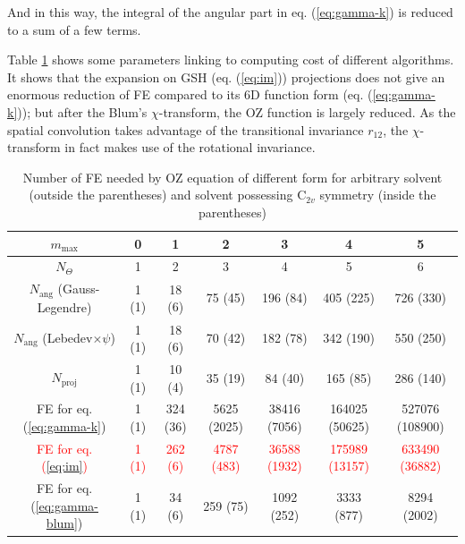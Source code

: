 And in this way, the integral of the angular part in eq. (\ref{eq:gamma-k})
is reduced to a sum of a few terms.

Table \ref{tab:FE-of-OZ} shows some parameters linking to computing
cost of different algorithms. It shows that the expansion on GSH (eq.
(\ref{eq:im})) projections does not give an enormous reduction of
FE compared to its 6D function form (eq. (\ref{eq:gamma-k})); but
after the Blum's $\chi$-transform, the OZ function is largely reduced.
As the spatial convolution takes advantage of the transitional invariance
$r_{12}$, the $\chi$-transform in fact makes use of the rotational
invariance.

\begin{table}[h]
\begin{centering}
\begin{tabular*}{1\textwidth}{@{\extracolsep{\fill}}ccccccc}
\toprule 
{\footnotesize{}$m_{\mathrm{max}}$} & {\footnotesize{}0} & {\footnotesize{}1} & {\footnotesize{}2} & {\footnotesize{}3} & {\footnotesize{}4} & {\footnotesize{}5}\tabularnewline
\midrule
{\footnotesize{}$N_{\Theta}$} & {\footnotesize{}1} & {\footnotesize{}2} & {\footnotesize{}3} & {\footnotesize{}4} & {\footnotesize{}5} & {\footnotesize{}6}\tabularnewline
{\footnotesize{}$N_{\mathrm{ang}}$ (Gauss-Legendre)} & {\footnotesize{}1 (1)} & {\footnotesize{}18 (6)} & {\footnotesize{}75 (45)} & {\footnotesize{}196 (84)} & {\footnotesize{}405 (225)} & {\footnotesize{}726 (330)}\tabularnewline
{\footnotesize{}$N_{\mathrm{ang}}$ (Lebedev$\times\psi$)} & {\footnotesize{}1 (1)} & {\footnotesize{}18 (6)} & {\footnotesize{}70 (42)} & {\footnotesize{}182 (78)} & {\footnotesize{}342 (190)} & {\footnotesize{}550 (250)}\tabularnewline
{\footnotesize{}$N_{\mathrm{proj}}$ } & {\footnotesize{}1 (1)} & {\footnotesize{}10 (4)} & {\footnotesize{}35 (19)} & {\footnotesize{}84 (40)} & {\footnotesize{}165 (85)} & {\footnotesize{}286 (140)}\tabularnewline
{\footnotesize{}FE for eq. (\ref{eq:gamma-k})} & {\footnotesize{}1 (1)} & {\footnotesize{}324 (36)} & {\footnotesize{}5625 (2025)} & {\footnotesize{}38416 (7056)} & {\footnotesize{}164025 (50625)} & {\footnotesize{}527076 (108900)}\tabularnewline
\textcolor{red}{\footnotesize{}FE for eq. (\ref{eq:im})} & \textcolor{red}{\footnotesize{}1 (1)} & \textcolor{red}{\footnotesize{}262 (6)} & \textcolor{red}{\footnotesize{}4787 (483)} & \textcolor{red}{\footnotesize{}36588 (1932)} & \textcolor{red}{\footnotesize{}175989 (13157)} & \textcolor{red}{\footnotesize{}633490 (36882)}\tabularnewline
{\footnotesize{}FE for eq. (\ref{eq:gamma-blum})} & {\footnotesize{}1 (1)} & {\footnotesize{}34 (6)} & {\footnotesize{}259 (75)} & {\footnotesize{}1092 (252)} & {\footnotesize{}3333 (877)} & {\footnotesize{}8294 (2002)}\tabularnewline
\bottomrule
\end{tabular*}
\par\end{centering}

\caption[Number of FE needed by OZ equation of different form]{Number of FE needed by OZ equation of different form for arbitrary
solvent (outside the parentheses) and solvent possessing $\mathrm{C}_{2v}$
symmetry (inside the parentheses)\label{tab:FE-of-OZ}}
\end{table}



